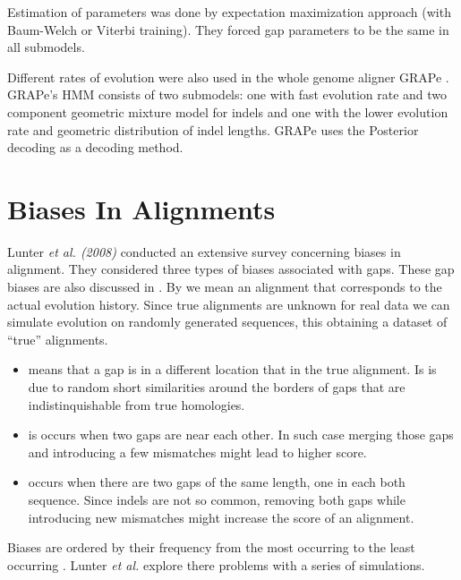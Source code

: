 Estimation of parameters was done by expectation maximization approach (with
Baum-Welch or Viterbi training). They forced gap parameters to be the same in all
submodels.

Different rates of evolution were also used  in the whole genome aligner GRAPe
\cite{Satija2010}. GRAPe's HMM  consists of two submodels: one with fast
evolution rate and two component geometric mixture model for indels and one with
the lower evolution rate and geometric distribution of indel lengths. GRAPe uses
the Posterior decoding as a decoding method.


\section{Biases In Alignments}
\label{SECTION:BIASES}
Lunter {\it et al. (2008)} conducted an extensive survey concerning biases in
alignment. They considered three types of biases associated with gaps. These gap
biases are also discussed in \cite{Durbin1998}. By 
we mean an alignment that corresponds to the actual evolution history.  Since
true alignments are unknown for real data we can simulate evolution on randomly
generated sequences, this obtaining a dataset of ``true'' alignments.

\begin{itemize}

\item {} means that a gap is in a different location that in
the true alignment. Is is due to random short similarities around the borders of
gaps that are indistinquishable from true homologies.

\item {} is occurs when two gaps are near each other.
In such case merging those gaps and introducing a few mismatches might lead to
higher score. 

\item {} occurs when there are two gaps of the same
length, one in each both sequence. Since indels are not so common, removing both
gaps while introducing new mismatches might increase the score of an alignment.

\end{itemize}


Biases are ordered by their frequency from the most occurring to the least
occurring \cite{Lunter2008}. Lunter {\it et al.} explore there problems with a
series of simulations.

